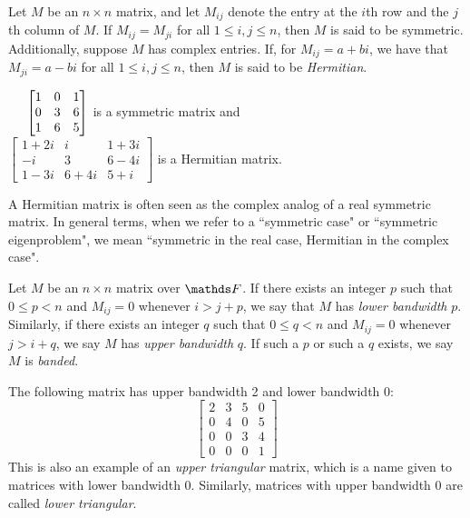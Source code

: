 \documentclass[10pt,twocolumn]{article}
\begin{document}
\begin{definition}
    Let $M$ be an $n\times n$ matrix, and let $M_{ij}$ denote the entry at the $i$th row and the $j$th column of $M$. If $M_{ij}=M_{ji}$ for all $1\leq i,j \leq n$, then $M$ is said to be symmetric.\\
    Additionally, suppose $M$ has complex entries. If, for $M_{ij}=a+bi$, we have that $M_{ji}=a-bi$ for all $1\leq i,j \leq n$, then $M$ is said to be \textit{Hermitian}.
\end{definition}

\begin{example}\text{ }

\vspace{0.2cm}
\centering
     $\hspace{0.5cm}\begin{bmatrix}
1 & 0 & 1 \\
0 & 3 & 6 \\
1 & 6 & 5 
\end{bmatrix}$ is a symmetric matrix and \\
$\begin{bmatrix}
1+2i & i & 1+3i \\
-i & 3 & 6-4i \\
1-3i & 6+4i & 5+i 
\end{bmatrix}$ is a Hermitian matrix.
\end{example}

A Hermitian matrix is often seen as the complex analog of a real symmetric matrix. In general terms, when we refer to a ``symmetric case" or ``symmetric eigenproblem", we mean ``symmetric in the real case, Hermitian in the complex case".

\begin{definition}
    Let $M$ be an $n\times n$ matrix over $\bbF$. If there exists an integer $p$ such that $0\leq p < n$ and $M_{ij}=0$ whenever $i>j+p$, we say that $M$ has \textit{lower bandwidth} $p$.
    Similarly, if there exists an integer $q$ such that $0\leq q < n$ and $M_{ij}=0$ whenever $j>i+q$, we say $M$ has \textit{upper bandwidth} $q$. If such a $p$ or such a $q$ exists, we say $M$ is \textit{banded}.
\end{definition}

\begin{example} The following matrix has upper bandwidth 2 and lower bandwidth 0:
    $$ \begin{bmatrix}
2 & 3 & 5 & 0 \\
0 & 4 & 0 & 5 \\
0 & 0 & 3 & 4 \\
0 & 0 & 0 & 1 
\end{bmatrix}  $$
This is also an example of an \textit{upper triangular} matrix, which is a name given to matrices with lower bandwidth 0. Similarly, matrices with upper bandwidth 0 are called \textit{lower triangular}.
\end{example}
\end{document}
